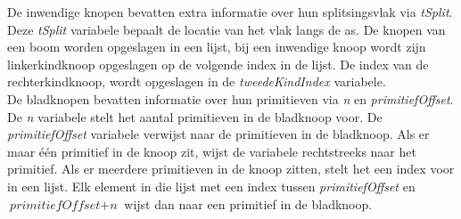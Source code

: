 De inwendige knopen bevatten extra informatie over hun splitsingsvlak via \textit{tSplit}.
Deze \textit{tSplit} variabele bepaalt de locatie van het vlak langs de as.
De knopen van een boom worden opgeslagen in een lijst, bij een inwendige knoop wordt zijn linkerkindknoop opgeslagen op de volgende index in de lijst.
De index van de rechterkindknoop, wordt opgeslagen in de \textit{tweedeKindIndex} variabele.\\

De bladknopen bevatten informatie over hun primitieven via \textit{n} en \textit{primitiefOffset}.
De \textit{n} variabele stelt het aantal primitieven in de bladknoop voor.
De \textit{primitiefOffset} variabele verwijst naar de primitieven in de bladknoop.
Als er maar één primitief in de knoop zit, wijst de variabele rechtstreeks naar het primitief.
Als er meerdere primitieven in de knoop zitten, stelt het een index voor in een lijst.
Elk element in die lijst met een index tussen \textit{primitiefOffset} en $\textit{primitiefOffset} + \textit{n}$ wijst dan naar een primitief in de bladknoop.\\

